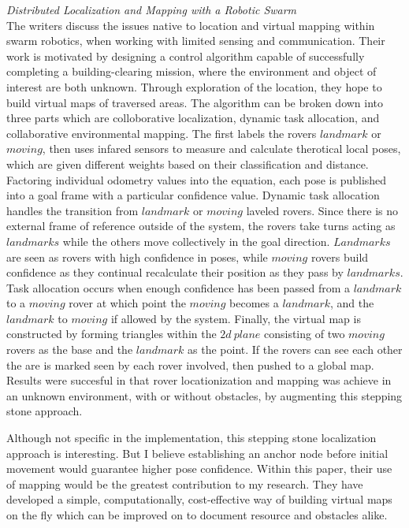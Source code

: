 \textit{Distributed Localization and Mapping with a Robotic Swarm}~\cite{rothermich2004distributed} \\

The writers discuss the issues native to location and virtual mapping within swarm robotics, when working with limited sensing and communication. Their work is motivated by designing a control algorithm capable of successfully completing a building-clearing mission, where the environment and object of interest are both unknown. Through exploration of the location, they hope to build virtual maps of traversed areas. The algorithm can be broken down into three parts which are colloborative localization, dynamic task allocation, and collaborative environmental mapping. The first labels the rovers $landmark$ or $moving$, then uses infared sensors to measure and calculate therotical local poses, which are given different weights based on their classification and distance. Factoring individual odometry values into the equation, each pose is published into a goal frame with a particular confidence value. Dynamic task allocation handles the transition from $landmark$ or $moving$ laveled rovers. Since there is no external frame of reference outside of the system, the rovers take turns acting as $landmarks$ while the others move collectively in the goal direction. $Landmarks$ are seen as rovers with high confidence in poses, while $moving$ rovers build confidence as they continual recalculate their position as they pass by $landmarks$. Task allocation occurs when enough confidence has been passed from a $landmark$ to a $moving$ rover at which point the $moving$ becomes a $landmark$, and the $landmark$ to $moving$ if allowed by the system. Finally, the virtual map is constructed by forming triangles within the $2d~plane$ consisting of two $moving$ rovers as the base and the $landmark$ as the point. If the rovers can see each other the are is marked seen by each rover involved, then pushed to a global map. Results were succesful in that rover locationization and mapping was achieve in an unknown environment, with or without obstacles, by augmenting this stepping stone approach.

Although not specific in the implementation, this stepping stone localization approach is interesting. But I believe establishing an anchor node before initial movement would guarantee higher pose confidence. Within this paper, their use of mapping would be the greatest contribution to my research. They have developed a simple, computationally, cost-effective way of building virtual maps on the fly which can be improved on to document resource and obstacles alike.